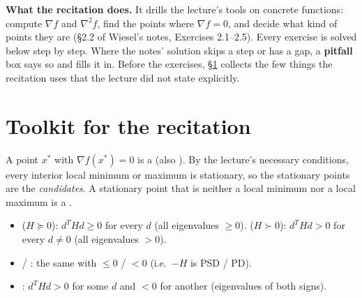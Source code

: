 
\begin{plainbox}
\textbf{What the recitation does.} It drills the lecture's tools on concrete functions: compute $\nabla f$ and $\nabla^2f$, find the points where $\nabla f=0$,
and decide what kind of points they are (\S2.2 of Wiesel's notes, Exercises 2.1--2.5). Every exercise is solved below step by step.
Where the notes' solution skips a step or has a gap, a \textbf{pitfall} box says so and fills it in.
Before the exercises, \S\ref{sec:toolkit} collects the few things the recitation uses that the lecture did not state explicitly.
\end{plainbox}

\section{Toolkit for the recitation}\label{sec:toolkit}

\begin{defn}
A point $x^*$ with $\nabla f(x^*)=0$ is a  (also ). By the lecture's necessary conditions, every interior local minimum or maximum is stationary,
so the stationary points are the \emph{candidates}. A stationary point that is neither a local minimum nor a local maximum is a .
\end{defn}

\begin{defn}
\begin{itemize}
  \item {} ($H\succeq0$): $d^THd\ge0$ for every $d$ (all eigenvalues $\ge0$).  ($H\succ0$): $d^THd>0$ for every $d\ne0$ (all eigenvalues $>0$).
  \item {} / : the same with $\le0$ / $<0$ (i.e.\ $-H$ is PSD / PD).
  \item {}: $d^THd>0$ for some $d$ and $<0$ for another (eigenvalues of both signs).
\end{itemize}
\end{defn}

